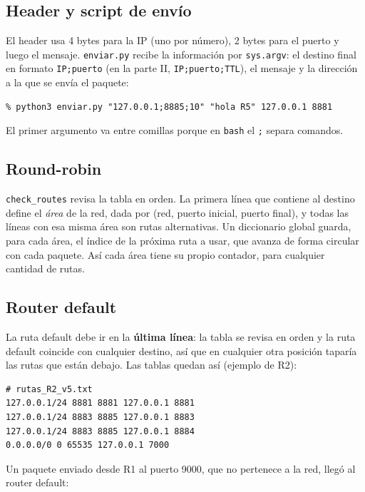 \documentclass[11pt,letterpaper]{article}
\begin{document}
\subsection{Header y script de envío}

El header usa 4 bytes para la IP (uno por número), 2 bytes para el puerto y luego el
mensaje. \texttt{enviar.py} recibe la información por \texttt{sys.argv}: el destino final
en formato \texttt{IP;puerto} (en la parte II, \texttt{IP;puerto;TTL}), el mensaje y la
dirección a la que se envía el paquete:

\begin{lstlisting}
% python3 enviar.py "127.0.0.1;8885;10" "hola R5" 127.0.0.1 8881
\end{lstlisting}

El primer argumento va entre comillas porque en \texttt{bash} el \texttt{;} separa
comandos.

\subsection{Round-robin}

\texttt{check\_routes} revisa la tabla en orden. La primera línea que contiene al destino
define el \emph{área} de la red, dada por (red, puerto inicial, puerto final), y todas las
líneas con esa misma área son rutas alternativas. Un diccionario global guarda, para cada
área, el índice de la próxima ruta a usar, que avanza de forma circular con cada paquete.
Así cada área tiene su propio contador, para cualquier cantidad de rutas.

\subsection{Router default}

La ruta default debe ir en la \textbf{última línea}: la tabla se revisa en orden y la ruta
default coincide con cualquier destino, así que en cualquier otra posición taparía las
rutas que están debajo. Las tablas quedan así (ejemplo de R2):

\begin{lstlisting}
# rutas_R2_v5.txt
127.0.0.1/24 8881 8881 127.0.0.1 8881
127.0.0.1/24 8883 8885 127.0.0.1 8883
127.0.0.1/24 8883 8885 127.0.0.1 8884
0.0.0.0/0 0 65535 127.0.0.1 7000
\end{lstlisting}

Un paquete enviado desde R1 al puerto 9000, que no pertenece a la red, llegó al router
default:
\end{document}
